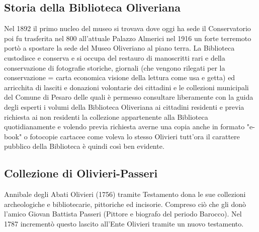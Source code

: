 \documentclass[hidelinks,12pt,a4paper]{article}
\begin{document}
\begin{flushleft}
		\section{Storia della Biblioteca Oliveriana}
		Nel 1892 il primo nucleo del museo si trovava dove oggi ha sede il Conservatorio poi fu trasferita nel 800 all'attuale Palazzo Almerici nel 1916 un forte terremoto portò a spostare la sede del Museo Oliveriano al piano terra. La Biblioteca custodisce e conserva e si occupa del restauro di manoscritti rari e della conservazione di fotografie storiche, giornali (che vengono rilegati per la conservazione = carta economica visione della lettura come usa e getta) ed arricchita di lasciti e donazioni volontarie dei cittadini e le collezioni municipali del Comune di Pesaro delle quali è permesso consultare liberamente con la guida degli esperti i volumi della Biblioteca Oliveriana ai cittadini residenti e previa richiesta ai non residenti la collezione appartenente alla Biblioteca quotidianamente e volendo previa richiesta averne una copia anche in formato "e- book" o fotocopie cartacee come voleva lo stesso Olivieri tutt'ora il carattere pubblico della Biblioteca è quindi così ben evidente.
		
		\subsection{Collezione di Olivieri-Passeri}
		Annibale degli Abati Olivieri (1756) tramite Testamento dona le sue collezioni archeologiche e bibliotecarie, pittoriche ed incisorie. Compreso ciò che gli donò l’amico Giovan Battista Passeri (Pittore e biografo del periodo Barocco). Nel 1787 incrementò questo lascito all'Ente Olivieri tramite un nuovo testamento.
		

\end{flushleft}
\end{document}
